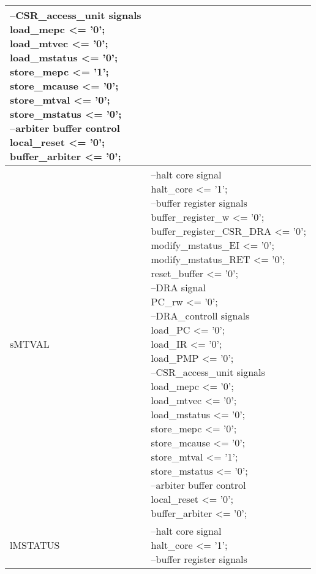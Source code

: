 \begin{small}
\begin{longtable}{| p{} | p{} |}
{		--CSR\_access\_unit signals\\
		load\_mepc <= '0';\\
		load\_mtvec <= '0';\\
		load\_mstatus <= '0';\\
		store\_mepc <= '1';\\
		store\_mcause <= '0';\\
		store\_mtval <= '0';\\
		store\_mstatus <= '0';\\
		--arbiter buffer control\\
		local\_reset <= '0';\\
		buffer\_arbiter <= '0';} \\
	\hline
	sMTVAL & \makecell{--halt core signal\\
		halt\_core <= '1';\\
		--buffer register signals\\
		buffer\_register\_w <= '0';\\
		buffer\_register\_CSR\_DRA <= '0';\\
		modify\_mstatus\_EI <= '0';\\
		modify\_mstatus\_RET <= '0';\\
		reset\_buffer <= '0';\\
		--DRA signal\\
		PC\_rw <= '0';\\
		--DRA\_controll signals\\
		load\_PC <= '0';\\
		load\_IR <= '0';\\
		load\_PMP <= '0';\\
		--CSR\_access\_unit signals\\
		load\_mepc <= '0';\\
		load\_mtvec <= '0';\\
		load\_mstatus <= '0';\\
		store\_mepc <= '0';\\
		store\_mcause <= '0';\\
		store\_mtval <= '1';\\
		store\_mstatus <= '0';\\
		--arbiter buffer control\\
		local\_reset <= '0';\\
		buffer\_arbiter <= '0';} \\
	\hline
	lMSTATUS & \makecell{--halt core signal\\
		halt\_core <= '1';\\
		--buffer register signals\\
}
\end{longtable}
\end{small}
